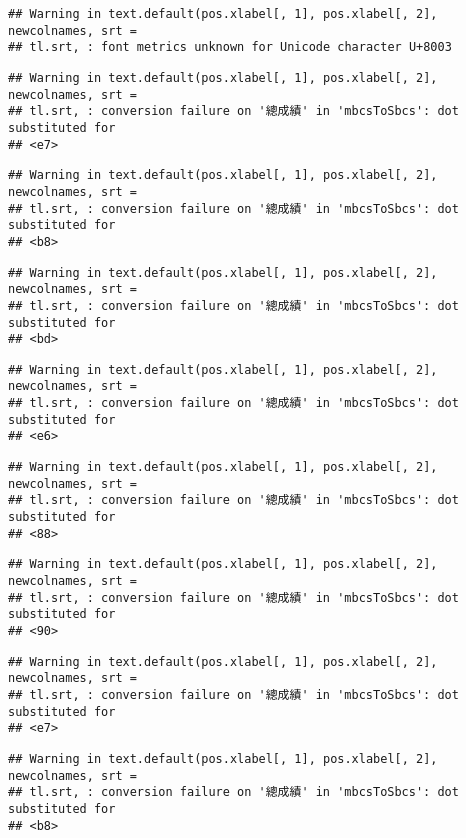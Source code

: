 \documentclass[
]{book}
\begin{document}
\begin{verbatim}
## Warning in text.default(pos.xlabel[, 1], pos.xlabel[, 2], newcolnames, srt =
## tl.srt, : font metrics unknown for Unicode character U+8003
\end{verbatim}

\begin{verbatim}
## Warning in text.default(pos.xlabel[, 1], pos.xlabel[, 2], newcolnames, srt =
## tl.srt, : conversion failure on '總成績' in 'mbcsToSbcs': dot substituted for
## <e7>
\end{verbatim}

\begin{verbatim}
## Warning in text.default(pos.xlabel[, 1], pos.xlabel[, 2], newcolnames, srt =
## tl.srt, : conversion failure on '總成績' in 'mbcsToSbcs': dot substituted for
## <b8>
\end{verbatim}

\begin{verbatim}
## Warning in text.default(pos.xlabel[, 1], pos.xlabel[, 2], newcolnames, srt =
## tl.srt, : conversion failure on '總成績' in 'mbcsToSbcs': dot substituted for
## <bd>
\end{verbatim}

\begin{verbatim}
## Warning in text.default(pos.xlabel[, 1], pos.xlabel[, 2], newcolnames, srt =
## tl.srt, : conversion failure on '總成績' in 'mbcsToSbcs': dot substituted for
## <e6>
\end{verbatim}

\begin{verbatim}
## Warning in text.default(pos.xlabel[, 1], pos.xlabel[, 2], newcolnames, srt =
## tl.srt, : conversion failure on '總成績' in 'mbcsToSbcs': dot substituted for
## <88>
\end{verbatim}

\begin{verbatim}
## Warning in text.default(pos.xlabel[, 1], pos.xlabel[, 2], newcolnames, srt =
## tl.srt, : conversion failure on '總成績' in 'mbcsToSbcs': dot substituted for
## <90>
\end{verbatim}

\begin{verbatim}
## Warning in text.default(pos.xlabel[, 1], pos.xlabel[, 2], newcolnames, srt =
## tl.srt, : conversion failure on '總成績' in 'mbcsToSbcs': dot substituted for
## <e7>
\end{verbatim}

\begin{verbatim}
## Warning in text.default(pos.xlabel[, 1], pos.xlabel[, 2], newcolnames, srt =
## tl.srt, : conversion failure on '總成績' in 'mbcsToSbcs': dot substituted for
## <b8>
\end{verbatim}
\end{document}
